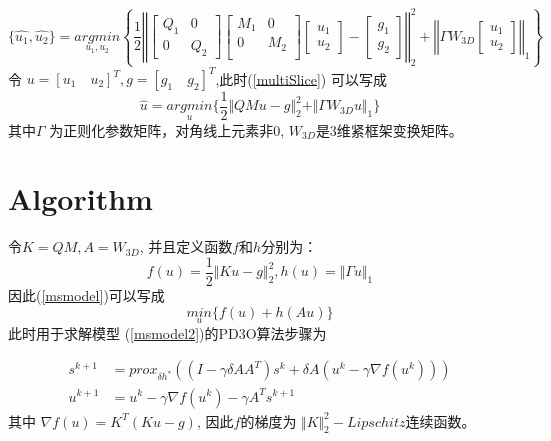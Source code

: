 \documentclass[lang=cn,11pt,a4paper,cite=numbers]{elegantpaper}
\begin{document}
\begin{equation}\label{multiSlice}
	\{\hat{u_1}, \hat{u_2}\} = \underset{u_1, u_2}{argmin}\left\{ \frac{1}{2} \left \Vert 
	\begin{bmatrix}
		Q_1 & 0\\
		0 & Q_2
	\end{bmatrix}
	\begin{bmatrix}
		M_1 & 0 \\
		0 & M_2 \\
	\end{bmatrix}
	\begin{bmatrix}
		u_1 \\
		u_2
	\end{bmatrix}
	- \begin{bmatrix}
		g_1 \\
		g_2
	\end{bmatrix}
	 \right\Vert_2^2 + 
	 \left\Vert
	 \Gamma W_{3D} 
	 \begin{bmatrix}
	 	u_1 \\
	 	u_2
	 \end{bmatrix}
	 \right\Vert_1
	 \right\}
\end{equation}
令 $u = [u_1 \quad u_2]^T, g = [g_1 \quad g_2]^T$,此时(\ref{multiSlice}) 可以写成
\begin{equation} \label{msmodel}
	\hat{u} = \underset{u}{argmin} \{\frac{1}{2} \Vert QMu-g \Vert_2^2 + \Vert \Gamma W_{3D}u \Vert_1\}
\end{equation}
其中$\Gamma$ 为正则化参数矩阵，对角线上元素非0, $W_{3D}$是3维紧框架变换矩阵。
\section{Algorithm}
\par 令$K = QM, A = W_{3D}$, 并且定义函数$f$和$h$分别为：
\begin{equation}
	f(u) = \frac{1}{2}\Vert Ku-g \Vert_2^2, h(u) = \Vert \Gamma u\Vert_1
\end{equation}
因此(\ref{msmodel})可以写成
\begin{equation}\label{msmodel2}
	\underset{u}{min} \{f(u) + h(Au)\}
\end{equation}
此时用于求解模型 (\ref{msmodel2})的PD3O算法步骤为

\begin{align}
	s^{k+1}&=prox_{\delta h^*}((I-\gamma \delta AA^T)s^k + \delta A(u^k - \gamma \nabla f(u^k))) \\
	u^{k+1}& = u^k - \gamma \nabla f(u^k) -\gamma A^T s^{k+1} 
\end{align}
其中 $\nabla f(u) = K^T(Ku - g)$, 因此$f$的梯度为 $\Vert K \Vert_2^2-Lipschitz $连续函数。
\newpage


\end{document}
